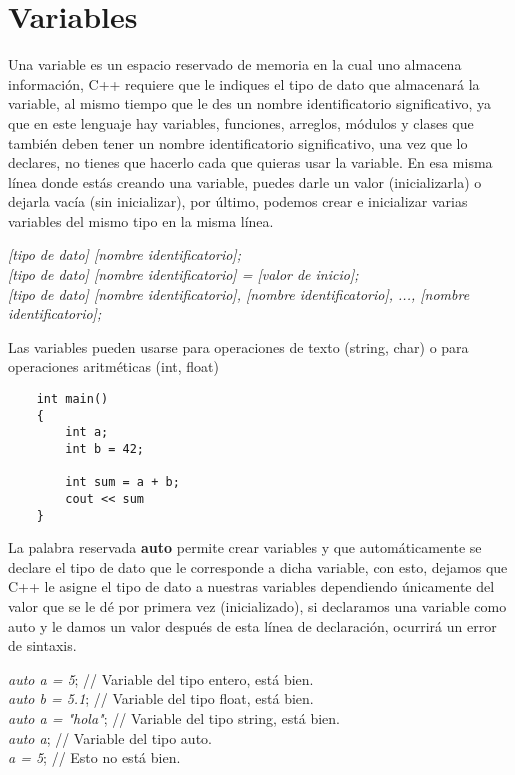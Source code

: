\section{Variables}
\hspace{0.55cm}Una variable es un espacio reservado de memoria en la cual uno almacena información, C++ requiere que le indiques el tipo de dato que almacenará la variable, al mismo tiempo que le des un nombre identificatorio significativo, ya que en este lenguaje hay variables, funciones, arreglos, módulos y clases que también deben tener un nombre identificatorio significativo, una vez que lo declares, no tienes que hacerlo cada que quieras usar la variable. En esa misma línea donde estás creando una variable, puedes darle un valor (inicializarla) o dejarla vacía (sin inicializar), por último, podemos crear e inicializar varias variables del mismo tipo en la misma línea.
\begin{center}
    \textit{[tipo de dato] [nombre identificatorio];} \\
    \textit{[tipo de dato] [nombre identificatorio] = [valor de inicio];} \\
    \textit{[tipo de dato] [nombre identificatorio], [nombre identificatorio], ..., [nombre identificatorio];}
\end{center}

Las variables pueden usarse para operaciones de texto (string, char) o para operaciones aritméticas (int, float)
\begin{lstlisting}
    int main()
    {
        int a;
        int b = 42;
        
        int sum = a + b;
        cout << sum
    }
\end{lstlisting}

La palabra reservada \textbf{auto} permite crear variables y que automáticamente se declare el tipo de dato que le corresponde a dicha variable, con esto, dejamos que C++ le asigne el tipo de dato a nuestras variables dependiendo únicamente del valor que se le dé por primera vez (inicializado), si declaramos una variable como auto y le damos un valor después de esta línea de declaración, ocurrirá un error de sintaxis.
\begin{center}
    \textit{auto a = 5}; // Variable del tipo entero, está bien. \\
    \textit{auto b = 5.1}; // Variable del tipo float, está bien. \\
    \textit{auto a = "hola"}; // Variable del tipo string, está bien. \\
    \textit{auto a}; // Variable del tipo auto. \\
    \textit{a = 5}; // Esto no está bien.
\end{center}


